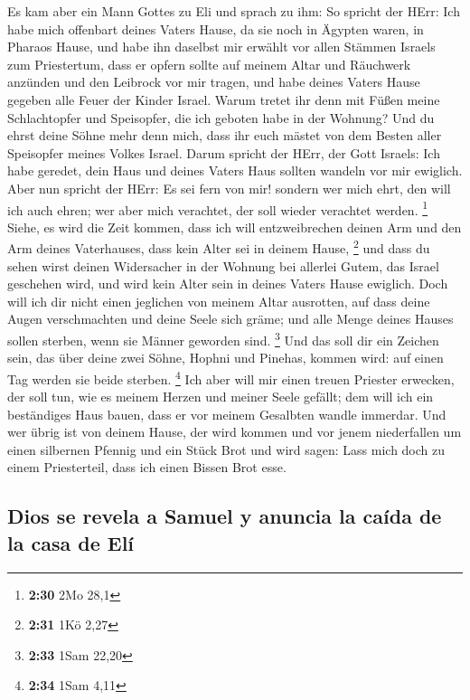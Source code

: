  Es kam aber ein Mann Gottes zu Eli und sprach zu ihm: So
spricht der HErr: Ich habe mich offenbart deines Vaters Hause, da sie
noch in Ägypten waren, in Pharaos Hause,  und habe ihn
daselbst mir erwählt vor allen Stämmen Israels zum Priestertum, dass er
opfern sollte auf meinem Altar und Räuchwerk anzünden und den Leibrock
vor mir tragen, und habe deines Vaters Hause gegeben alle Feuer der
Kinder Israel.  Warum tretet ihr denn mit Füßen meine
Schlachtopfer und Speisopfer, die ich geboten habe in der Wohnung? Und
du ehrst deine Söhne mehr denn mich, dass ihr euch mästet von dem Besten
aller Speisopfer meines Volkes Israel.  Darum spricht der
HErr, der Gott Israels: Ich habe geredet, dein Haus und deines Vaters
Haus sollten wandeln vor mir ewiglich. Aber nun spricht der HErr: Es sei
fern von mir! sondern wer mich ehrt, den will ich auch ehren; wer aber
mich verachtet, der soll wieder verachtet werden. \footnote{\textbf{2:30}
  2Mo 28,1}  Siehe, es wird die Zeit kommen, dass ich
will entzweibrechen deinen Arm und den Arm deines Vaterhauses, dass kein
Alter sei in deinem Hause, \footnote{\textbf{2:31} 1Kö 2,27}
 und dass du sehen wirst deinen Widersacher in der
Wohnung bei allerlei Gutem, das Israel geschehen wird, und wird kein
Alter sein in deines Vaters Hause ewiglich.  Doch will
ich dir nicht einen jeglichen von meinem Altar ausrotten, auf dass deine
Augen verschmachten und deine Seele sich gräme; und alle Menge deines
Hauses sollen sterben, wenn sie Männer geworden sind. \footnote{\textbf{2:33}
  1Sam 22,20}  Und das soll dir ein Zeichen sein, das
über deine zwei Söhne, Hophni und Pinehas, kommen wird: auf einen Tag
werden sie beide sterben. \footnote{\textbf{2:34} 1Sam 4,11}
 Ich aber will mir einen treuen Priester erwecken, der
soll tun, wie es meinem Herzen und meiner Seele gefällt; dem will ich
ein beständiges Haus bauen, dass er vor meinem Gesalbten wandle
immerdar.  Und wer übrig ist von deinem Hause, der wird
kommen und vor jenem niederfallen um einen silbernen Pfennig und ein
Stück Brot und wird sagen: Lass mich doch zu einem Priesterteil, dass
ich einen Bissen Brot esse.

\hypertarget{dios-se-revela-a-samuel-y-anuncia-la-cauxedda-de-la-casa-de-eluxed}{%
\subsection{Dios se revela a Samuel y anuncia la caída de la casa de
Elí}\label{dios-se-revela-a-samuel-y-anuncia-la-cauxedda-de-la-casa-de-eluxed}}


